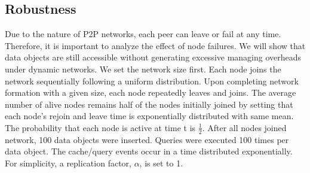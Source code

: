 \documentclass[conference]{IEEEtran}
\begin{document}
\subsection{Robustness}
Due to the nature of P2P networks, each peer can leave or fail 
at any time. Therefore, it is important to analyze the effect of node failures.
We will show that data objects are still accessible without generating 
excessive managing overheads under dynamic networks.
We set the network size first. Each node joins the network sequentially
following a uniform distribution.
Upon completing network formation with a given size, each node repeatedly 
leaves and joins.
The average number of alive nodes remains half of the nodes initially joined
by setting that each node's rejoin and leave time is exponentially distributed
with same mean.
%
The probability that each node is active at time t is $\frac{1}{2}$.
After all nodes joined network, 100 data objects were inserted.
Queries were executed 100 times per data object. 
The cache/query events occur 
in a time distributed exponentially.
For simplicity, a replication factor, $\alpha$, is set to 1.
\end{document}
